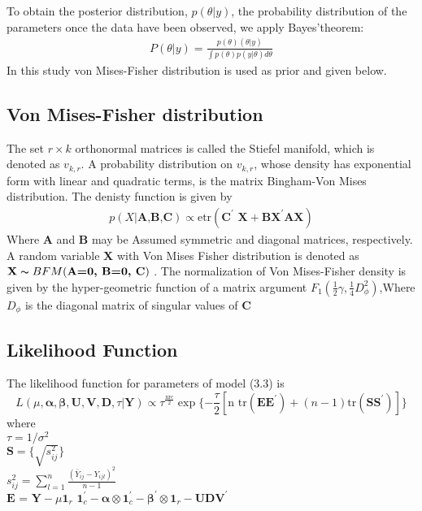 To obtain the posterior distribution, $p(\theta|y)$, the probability distribution
of the parameters once the data have been observed, we apply Bayes'theorem:
\begin{eqnarray}
	P(\theta|y)=\frac{p(\theta)(\theta|y)}{\int p(\theta)p(y|\theta)d\theta}    \nonumber
\end{eqnarray}
In this study von Mises-Fisher distribution is used as prior and given below.
\subsection{Von Mises-Fisher distribution}
The set $r \times k$ orthonormal matrices is called the Stiefel manifold, which is denoted as  $v_{k,r}$. A probability distribution on $v_{k,r}$, whose density has exponential form with linear and quadratic terms, is the matrix Bingham-Von Mises distribution. The denisty function is given by
\begin{eqnarray}
p(X|\textbf{A,B,C}) \varpropto \text{etr}(\textbf{C}^\prime \textbf{ X} +\textbf{BX}^\prime \textbf{AX}) \nonumber
\end{eqnarray}
Where \textbf{A} and \textbf{B} may be Assumed symmetric and diagonal matrices, respectively. A random variable \textbf{X} with Von Mises Fisher distribution is denoted as $\textbf{X} \thicksim BFM(\textbf{A=0, B=0, C})$ \citep{Khatri1977}. The normalization of Von Mises-Fisher density is given by the hyper-geometric function of a matrix argument $F_1(\frac{1}{2}\gamma,\frac{1}{4}D_\phi^2)$,Where $D_\phi$ is the diagonal matrix of singular values of \textbf{C} \citep{Herz1955,James1964}


\subsection{Likelihood Function}
The likelihood function for parameters of model (3.3) is
\begin{equation}
L(\mu,\bm{\alpha},\bm{\beta},\textbf{U},\textbf{V},\textbf{D},\tau|\textbf{Y}) \varpropto \tau^\frac{\text{nrc}}{2} \exp\{-\frac{\tau}{2}[\text{n tr} (\textbf{EE}^\prime)+(n-1) \text{tr}(\textbf{SS}^\prime)]\} \end{equation}  
where \\
 $\tau=1/\sigma^2$\\ $\textbf{S}=\{\sqrt{s_{ij}^2}\}$\\
$s_{ij}^2=\sum_{l=1}^n\frac{(\bar{Y}_{ij}-Y_{ijl})^2}{n-1}$ \\
 $\textbf{E = Y}-\mu\textbf{1}_r\textbf{ 1}_c^\prime-\bm{\alpha} \otimes\textbf{1}_c^\prime-\bm{\beta}^\prime\otimes \textbf{1}_r-\textbf{UDV}^\prime$
